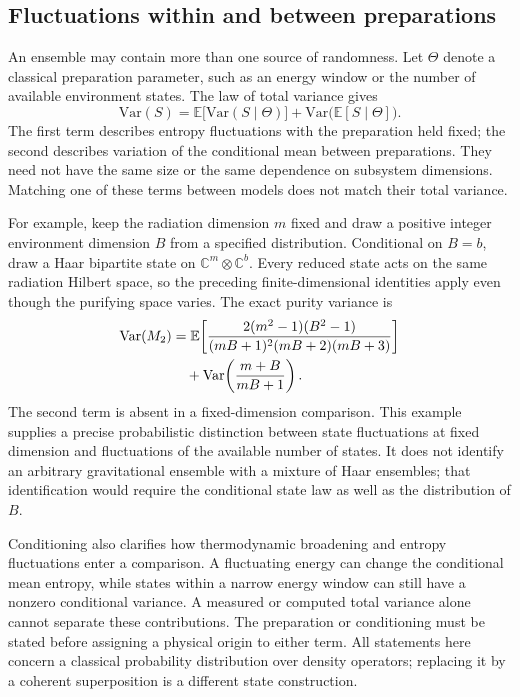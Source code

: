 \documentclass[11pt,letterpaper]{article}
\theoremstyle{plain}
\theoremstyle{definition}
\theoremstyle{remark}
\newcommand{\E}{\mathbb{E}}
\newcommand{\Var}{\text{Var}}
\begin{document}
\subsection{Fluctuations within and between preparations}
\label{subsec06:conditional_variance}

An ensemble may contain more than one source of randomness.  Let
$\Theta$ denote a classical preparation parameter, such as an energy
window or the number of available environment states.  The law of total
variance gives
\begin{equation}
 \Var(S)=\E\bigl[\Var(S\mid\Theta)\bigr]
       +\Var\bigl(\E[S\mid\Theta]\bigr).
 \label{eq06:total_variance}
\end{equation}
The first term describes entropy fluctuations with the preparation held
fixed; the second describes variation of the conditional mean between
preparations.  They need not have the same size or the same dependence
on subsystem dimensions.  Matching one of these terms between models
does not match their total variance.

For example, keep the radiation dimension $m$ fixed and draw a positive
integer environment dimension $B$ from a specified distribution.
Conditional on $B=b$, draw a Haar bipartite state on
$\mathbb C^m\otimes\mathbb C^b$.  Every reduced state acts on the
same radiation Hilbert space, so the preceding finite-dimensional
identities apply even though the purifying space varies.  The exact
purity variance is
\begin{align}
 \Var(M_2)
 &=\E\!\left[
 \frac{2(m^2-1)(B^2-1)}{(mB+1)^2(mB+2)(mB+3)}\right]
 \notag\\
 &\quad+\Var\!\left(\frac{m+B}{mB+1}\right).
 \label{eq06:random_dimension_variance}
\end{align}
The second term is absent in a fixed-dimension comparison.  This
example supplies a precise probabilistic distinction between state
fluctuations at fixed dimension and fluctuations of the available number
of states.  It does not identify an arbitrary gravitational ensemble
with a mixture of Haar ensembles; that identification would require
the conditional state law as well as the distribution of $B$.

Conditioning also clarifies how thermodynamic broadening and entropy
fluctuations enter a comparison.  A fluctuating energy can change the
conditional mean entropy, while states within a narrow energy window
can still have a nonzero conditional variance.  A measured or computed
total variance alone cannot separate these contributions.  The
preparation or conditioning must be stated before assigning a physical
origin to either term.  All statements here concern a classical
probability distribution over density operators; replacing it by a
coherent superposition is a different state construction.
\end{document}
